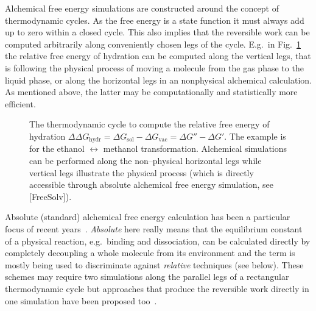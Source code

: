 \documentclass[journal=jctcce,manuscript=article]{achemso}
\begin{document}
Alchemical free energy simulations are constructed around the concept
of thermodynamic cycles.  As the free energy is a state function it
must always add up to zero within a closed cycle.  This also implies
that the reversible work can be computed arbitrarily along
conveniently chosen legs of the cycle.  E.g.\ in
Fig.~\ref{fig:thermocycle} the relative free energy of hydration can
be computed along the vertical legs, that is following the physical
process of moving a molecule from the gas phase to the liquid phase,
or along the horizontal legs in an nonphysical alchemical calculation.
As mentioned above, the latter may be computationally and
statistically more efficient.

\begin{figure}[ht]
  \caption{The thermodynamic cycle to compute the relative free energy
    of hydration
    $\Delta\Delta G_{\mathrm{hydr}}=\Delta G_{\mathrm{sol}}-\Delta
    G_{\mathrm{vac}}=\Delta G'' - \Delta G'$.  The example is for the
    ethanol $\leftrightarrow$ methanol transformation.  Alchemical
    simulations can be performed along the non--physical horizontal
    legs while vertical legs illustrate the physical process (which is
    directly accessible through absolute alchemical free energy
    simulation, see [FreeSolv]).}
  \label{fig:thermocycle}
\end{figure}

Absolute (standard) alchemical free energy calculation has been a
particular focus of recent years~\cite{GILSON19971047,
  doi:10.1021/jp0217839, deng_computations_2009,
  ytreberg_comparison_2006, doi:10.1021/ct500964e}.  \emph{Absolute}
here really means that the equilibrium constant of a physical
reaction, e.g.\ binding and dissociation, can be calculated directly
by completely decoupling a whole molecule from its environment and the
term is mostly being used to discriminate against \emph{relative}
techniques (see below).  These schemes may require two simulations
along the parallel legs of a rectangular thermodynamic cycle but
approaches that produce the reversible work directly in one simulation
have been proposed too~\cite{doi:10.1063/1.3519057, C3FD00125C}.
\end{document}
